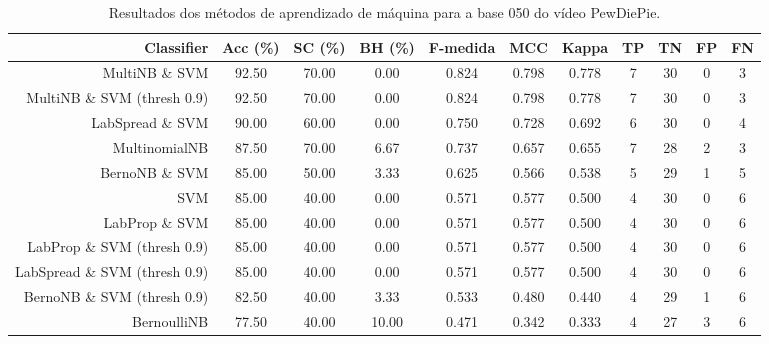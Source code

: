 \begin{table}[!htb]
\centering
\caption{Resultados dos métodos de aprendizado de máquina para a base 050 do vídeo PewDiePie.}
\label{tab:PewDiePie-050}
\begin{tabular}{r|c|c|c|c|c|c|c|c|c|c}
\hline\hline
Classifier & Acc (\%) & SC (\%) & BH (\%) & F-medida & MCC & Kappa & TP & TN & FP & FN \\ \hline
MultiNB \& SVM & 92.50 & 70.00 & 0.00 & 0.824 & 0.798 & 0.778 & 7 & 30 & 0 & 3 \\ 
MultiNB \& SVM (thresh 0.9) & 92.50 & 70.00 & 0.00 & 0.824 & 0.798 & 0.778 & 7 & 30 & 0 & 3 \\ 
LabSpread \& SVM & 90.00 & 60.00 & 0.00 & 0.750 & 0.728 & 0.692 & 6 & 30 & 0 & 4 \\ 
MultinomialNB & 87.50 & 70.00 & 6.67 & 0.737 & 0.657 & 0.655 & 7 & 28 & 2 & 3 \\ 
BernoNB \& SVM & 85.00 & 50.00 & 3.33 & 0.625 & 0.566 & 0.538 & 5 & 29 & 1 & 5 \\ 
SVM & 85.00 & 40.00 & 0.00 & 0.571 & 0.577 & 0.500 & 4 & 30 & 0 & 6 \\ 
LabProp \& SVM & 85.00 & 40.00 & 0.00 & 0.571 & 0.577 & 0.500 & 4 & 30 & 0 & 6 \\ 
LabProp \& SVM (thresh 0.9) & 85.00 & 40.00 & 0.00 & 0.571 & 0.577 & 0.500 & 4 & 30 & 0 & 6 \\ 
LabSpread \& SVM (thresh 0.9) & 85.00 & 40.00 & 0.00 & 0.571 & 0.577 & 0.500 & 4 & 30 & 0 & 6 \\ 
BernoNB \& SVM (thresh 0.9) & 82.50 & 40.00 & 3.33 & 0.533 & 0.480 & 0.440 & 4 & 29 & 1 & 6 \\ 
BernoulliNB & 77.50 & 40.00 & 10.00 & 0.471 & 0.342 & 0.333 & 4 & 27 & 3 & 6 \\ 
\hline\hline
\end{tabular}
\end{table}
